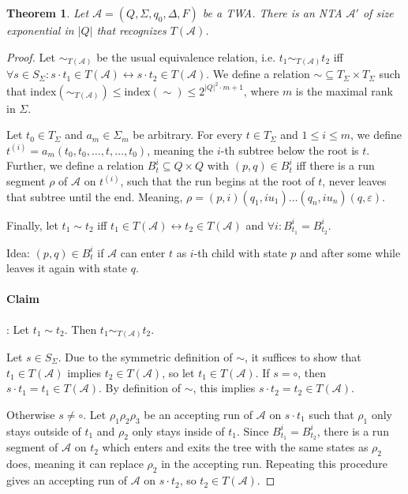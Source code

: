 \documentclass{article}
\newtheorem{theorem}{Theorem}
\begin{document}
\begin{theorem}
\label{twa_to_nta}
	Let $\mathcal{A} = (Q, \Sigma, q_0, \Delta, F)$ be a TWA. There is an NTA $\mathcal{A}'$ of size exponential in $|Q|$ that recognizes $T(\mathcal{A})$.
\end{theorem}
\begin{proof}
	Let $\sim_{T(\mathcal{A})}$ be the usual equivalence relation, i.e. $t_1 \sim_{T(\mathcal{A})} t_2$ iff $\forall s \in S_\Sigma: s \cdot t_1 \in T(\mathcal{A}) \leftrightarrow s \cdot t_2 \in T(\mathcal{A})$. We define a relation $\sim \subseteq T_\Sigma \times T_\Sigma$ such that $\text{index}(\sim_{T(\mathcal{A})}) \leq \text{index}(\sim) \leq 2^{|Q|^2 \cdot m + 1}$, where $m$ is the maximal rank in $\Sigma$.
	
	Let $t_0 \in T_\Sigma$ and $a_m \in \Sigma_m$ be arbitrary. For every $t \in T_\Sigma$ and $1 \leq i \leq m$, we define $t^{(i)} = a_m(t_0, t_0, \dots, t, \dots, t_0)$, meaning the $i$-th subtree below the root is $t$. Further, we define a relation $B_t^i \subseteq Q \times Q$ with $(p, q) \in B_t^i$ iff there is a run segment $\rho$ of $\mathcal{A}$ on $t^{(i)}$, such that the run begins at the root of $t$, never leaves that subtree until the end. Meaning, $\rho = (p, i) (q_1, i u_1) \dots (q_n, i u_n) (q, \varepsilon)$.
	
	Finally, let $t_1 \sim t_2$ iff $t_1 \in T(\mathcal{A}) \leftrightarrow t_2 \in T(\mathcal{A})$ and $\forall i: B^i_{t_1} = B^i_{t_2}$.
	
	Idea: $(p, q) \in B^i_t$ if $\mathcal{A}$ can enter $t$ as $i$-th child with state $p$ and after some while leaves it again with state $q$.
	
	\paragraph{Claim}: Let $t_1 \sim t_2$. Then $t_1 \sim_{T(\mathcal{A})} t_2$.
	
	Let $s \in S_\Sigma$. Due to the symmetric definition of $\sim$, it suffices to show that $t_1 \in T(\mathcal{A})$ implies $t_2 \in T(\mathcal{A})$, so let $t_1 \in T(\mathcal{A})$. If $s = \circ$, then $s \cdot t_1 = t_1 \in T(\mathcal{A})$. By definition of $\sim$, this implies $s \cdot t_2 = t_2 \in T(\mathcal{A})$.
	
	Otherwise $s \neq \circ$. Let $\rho_1 \rho_2 \rho_3$ be an accepting run of $\mathcal{A}$ on $s \cdot t_1$ such that $\rho_1$ only stays outside of $t_1$ and $\rho_2$ only stays inside of $t_1$. Since $B_{t_1}^i = B_{t_2}^i$, there is a run segment of $\mathcal{A}$ on $t_2$ which enters and exits the tree with the same states as $\rho_2$ does, meaning it can replace $\rho_2$ in the accepting run. Repeating this procedure gives an accepting run of $\mathcal{A}$ on $s \cdot t_2$, so $t_2 \in T(\mathcal{A})$.
	

\end{proof}
\end{document}
